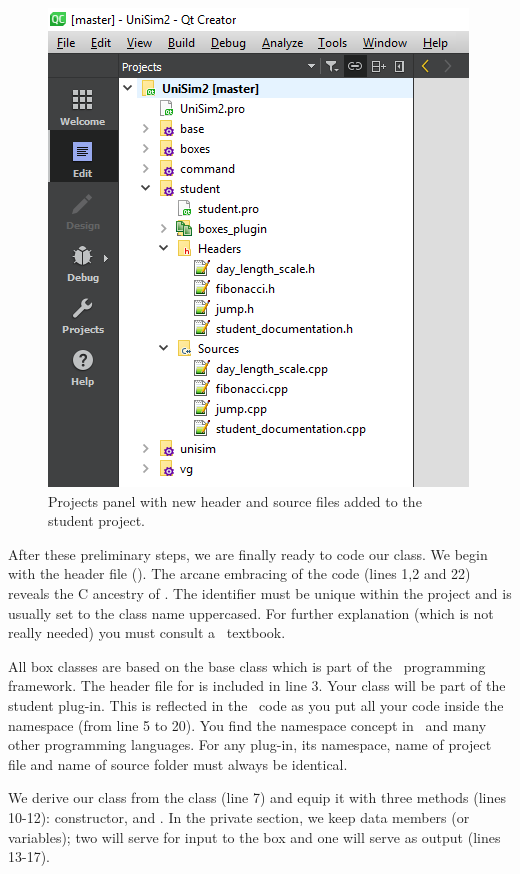\begin{figure}
\centering
\includegraphics[scale=0.7]{graphics/qt-creator-projects-student-2}
\caption{Projects panel with new header and source files added to the student project.}
\label{fig:qt-creator-projects-student-2}
\end{figure}

After these preliminary steps, we are finally ready to code our  class. We begin with the header file (). The arcane embracing of the code (lines 1,2 and 22) reveals the C ancestry of \CPP. The identifier  must be unique within the project and is usually set to the class name uppercased. For further explanation (which is not really needed) you must consult a \CPP\ textbook.

All box classes are based on the  base class which is part of the \US\ programming framework. The header file for  is included in line 3. Your class will be part of the student plug-in. This is reflected in the \CPP\ code as you put all your code inside the  namespace (from line 5 to 20). You find the namespace concept in \CPP\ and many other programming languages. For any plug-in, its namespace, name of project file and name of source folder must always be identical.

We derive our  class from the  class (line 7) and equip it with three methods (lines 10-12): constructor,  and . In the private section, we keep data members (or variables); two will serve for input to the box and one will serve as output (lines 13-17).

